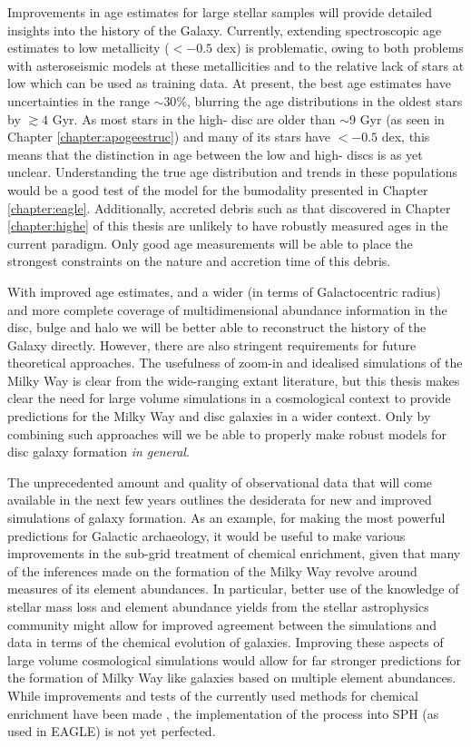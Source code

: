 Improvements in age estimates for large stellar samples will provide detailed insights into the history of the Galaxy. Currently, extending spectroscopic age estimates to low metallicity (\feh{}$< -0.5$ dex) is problematic, owing to both problems with asteroseismic models at these metallicities \citep[e.g.][]{2014ApJ...785L..28E} and to the relative lack of stars at low \feh{} which can be used as training data. At present, the best age estimates have uncertainties in the range $\sim 30\%$, blurring the age distributions in the oldest stars by $\gtrsim 4$ Gyr. As most stars in the high-\afe{} disc are older than $\sim 9$ Gyr (as seen in Chapter \ref{chapter:apogeestruc}) and many of its stars have \feh$< -0.5$ dex, this means that the distinction in age between the low and high-\afe{} discs is as yet unclear. Understanding the true age distribution and trends in these populations would be a good test of the model for the \afe{} bumodality presented in Chapter \ref{chapter:eagle}. Additionally, accreted debris such as that discovered in Chapter \ref{chapter:highe} of this thesis are unlikely to have robustly measured ages in the current paradigm. Only good age measurements will be able to place the strongest constraints on the nature and accretion time of this debris. 

With improved age estimates, and a wider (in terms of Galactocentric radius) and more complete coverage of multidimensional abundance information in the disc, bulge and halo we will be better able to reconstruct the history of the Galaxy directly. However, there are also stringent requirements for future theoretical approaches. The usefulness of zoom-in and idealised simulations of the Milky Way is clear from the wide-ranging extant literature, but this thesis makes clear the need for large volume simulations in a cosmological context to provide predictions for the Milky Way and disc galaxies in a wider context. Only by combining such approaches will we be able to properly make robust models for disc galaxy formation \emph{in general}. 

The unprecedented amount and quality of observational data that will come available in the next few years outlines the desiderata for new and improved simulations of galaxy formation. As an example, for making the most powerful predictions for Galactic archaeology, it would be useful to make various improvements in the sub-grid treatment of chemical enrichment, given that many of the inferences made on the formation of the Milky Way revolve around measures of its element abundances. In particular, better use of the knowledge of stellar mass loss and element abundance yields from the stellar astrophysics community might allow for improved agreement between the simulations and data in terms of the chemical evolution of galaxies. Improving these aspects of large volume cosmological simulations would allow for far stronger predictions for the formation of Milky Way like galaxies based on multiple element abundances. While improvements and tests of the currently used methods for chemical enrichment have been made \citep[e.g.][]{2009MNRAS.399..574W}, the implementation of the process into SPH (as used in EAGLE) is not yet perfected.

